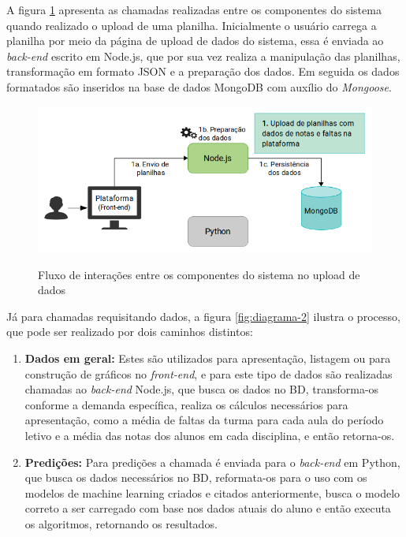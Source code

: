 A figura \ref{fig:diagrama-1} apresenta as chamadas realizadas entre os componentes do sistema quando realizado o upload de uma planilha. 
Inicialmente o usuário carrega a planilha por meio da página de upload de dados do sistema, essa é enviada ao \textit{back-end} escrito em Node.js, que por sua vez realiza a manipulação das planilhas, transformação em formato JSON e a preparação dos dados. 
Em seguida os dados formatados são inseridos na base de dados MongoDB com auxílio do \textit{Mongoose}.

\begin{figure}[htb]
    \centering
    \caption{Fluxo de interações entre os componentes do sistema no upload de dados}
    \includegraphics[height=0.35\textwidth]{./dados/figuras/diagrama1}
    \label{fig:diagrama-1}
\end{figure}

Já para chamadas requisitando dados, a figura \ref{fig:diagrama-2} ilustra o processo, que pode ser realizado por dois caminhos distintos:

\begin{enumerate}[topsep=5pt]
    \item \textbf{Dados em geral:} Estes são utilizados para apresentação, listagem ou para construção de gráficos no \textit{front-end}, e para este tipo de dados são realizadas chamadas ao \textit{back-end} Node.js, que busca os dados no BD, transforma-os conforme a demanda específica, realiza os cálculos necessários para apresentação, como a média de faltas da turma para cada aula do período letivo e a média das notas dos alunos em cada disciplina, e então retorna-os.
    \item \textbf{Predições:} Para predições a chamada é enviada para o \textit{back-end} em Python, que busca os dados necessários no BD, reformata-os para o uso com os modelos de machine learning criados e citados anteriormente, busca o modelo correto a ser carregado com base nos dados atuais do aluno e então executa os algoritmos, retornando os resultados. 
\end{enumerate}

